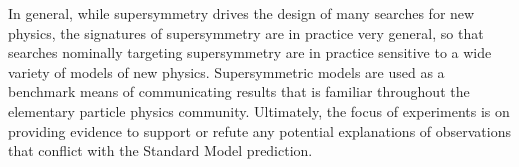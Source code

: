 In general, while supersymmetry drives the design of many searches for new physics, the signatures of supersymmetry are in practice very general, so that searches nominally targeting supersymmetry are in practice sensitive to a wide variety of models of new physics.
Supersymmetric models are used as a benchmark means of communicating results that is familiar throughout the elementary particle physics community.
Ultimately, the focus of experiments is on providing evidence to support or refute any potential explanations of observations that conflict with the Standard Model prediction.

